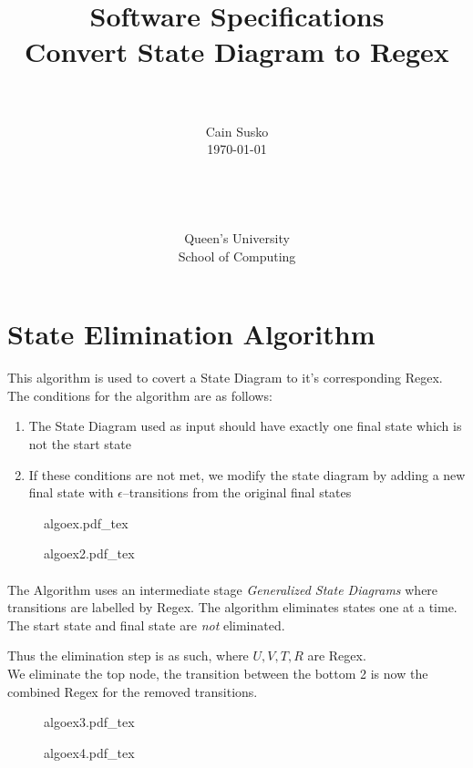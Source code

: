 \documentclass[12pt]{book}
\newcommand{\classID}{Convert State Diagram to Regex}
\newcommand{\coursename}{Software Specifications}
\newcommand{\incfig}[1]{%
    {#1.pdf_tex}
}
\begin{document}
\date{}
\setlength{\parindent}{0em}  %

\title{\coursename\\\classID}

\author{\\ \\ Cain Susko\\\today \\ \\ \\ \\ \\
        Queen's University \\School of Computing} 
 

\maketitle

\pagebreak

\section*{State Elimination Algorithm}
This algorithm is used to covert a State Diagram to it's corresponding Regex.
The conditions for the algorithm are as follows:
\begin{enumerate}
        \item The State Diagram used as input should have exactly one final state which is not the start state
        \item If these conditions are not met, we modify the state diagram by adding a new final state with $\epsilon$--transitions 
                from the original final states
\end{enumerate}

\begin{figure}[h]
        \centering
        \incfig{algoex}
        \incfig{algoex2}
\end{figure}

\paragraph{}
The Algorithm uses an intermediate stage \textit{Generalized State Diagrams} where transitions are labelled by Regex.
The algorithm eliminates states one at a time.
The start state and final state are \textit{not} eliminated.\\
\pagebreak

Thus the elimination step is as such, where $U, V, T, R$ are Regex.\\
We eliminate the top node, the transition between the bottom 2 is now the combined Regex for the removed transitions.
\begin{figure}[ht]
        \centering
        \incfig{algoex3}
\end{figure}
\begin{figure}[ht]
        \centering
        \incfig{algoex4}
\end{figure}
\end{document}
